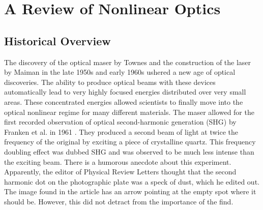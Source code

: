 
\section{A Review of Nonlinear Optics}



\subsection{Historical Overview}\label{chap_theory_hist}

The discovery of the optical maser by Townes \cite{PhysRev.112.1940} and the
construction of the laser by Maiman in the late 1950s and early 1960s ushered a
new age of optical discoveries. The ability to produce optical beams with these
devices automatically lead to very highly focused energies distributed over very
small areas. These concentrated energies allowed scientists to finally move into
the optical nonlinear regime for many different materials. The maser allowed for
the first recorded observation of optical second-harmonic generation (SHG) by
Franken et al. in 1961 \cite{PhysRevLett.7.118}. They produced a second beam of
light at twice the frequency of the original by exciting a piece of crystalline
quartz. This frequency doubling effect was dubbed SHG and was observed to be
much less intense than the exciting beam. There is a humorous anecdote about
this experiment. Apparently, the editor of Physical Review Letters thought that
the second harmonic dot on the photographic plate was a speck of dust, which he
edited out. The image found in the article has an arrow pointing at the empty
spot where it should be. However, this did not detract from the importance of
the find.

